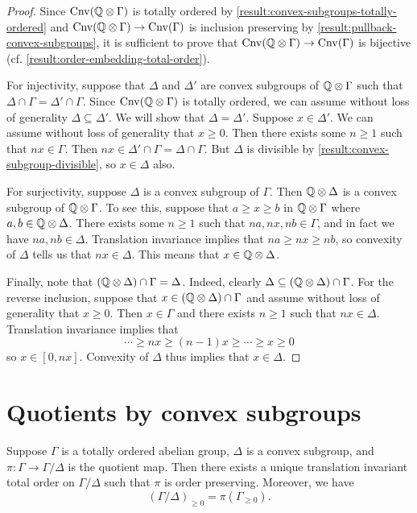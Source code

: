 \begin{proof}
Since $\operatorname{Cnv}(\mathbb{Q} \otimes \Gamma)$ is totally ordered by \cref{result:convex-subgroups-totally-ordered} and $\operatorname{Cnv}(\mathbb{Q} \otimes \Gamma) \to \operatorname{Cnv}(\Gamma)$ is inclusion preserving by \cref{result:pullback-convex-subgroups}, it is sufficient to prove that $\operatorname{Cnv}(\mathbb{Q} \otimes \Gamma) \to \operatorname{Cnv}(\Gamma)$ is bijective (cf. \cref{result:order-embedding-total-order}).  
	
For injectivity, suppose that $\Delta$ and $\Delta'$ are convex subgroups of $\mathbb{Q} \otimes \Gamma$ such that $\Delta \cap \Gamma = \Delta' \cap \Gamma$. Since $\operatorname{Cnv}(\mathbb{Q} \otimes \Gamma)$ is totally ordered, we can assume without loss of generality $\Delta \subseteq \Delta'$. We will show that $\Delta = \Delta'$. Suppose $x \in \Delta'$. We can assume without loss of generality that $x \geq 0$. Then there exists some $n \geq 1$ such that $nx \in \Gamma$. Then $nx \in \Delta' \cap \Gamma = \Delta \cap \Gamma$. But $\Delta$ is divisible by \cref{result:convex-subgroup-divisible}, so $x \in \Delta$ also. 

For surjectivity, suppose $\Delta$ is a convex subgroup of $\Gamma$. Then $\mathbb{Q} \otimes \Delta$ is a convex subgroup of $\mathbb{Q} \otimes \Gamma$. To see this, suppose that $a \geq x \geq b$ in $\mathbb{Q} \otimes \Gamma$ where $a, b \in \mathbb{Q} \otimes \Delta$. There exists some $n \geq 1$ such that $na, nx, nb \in \Gamma$, and in fact we have $na, nb \in \Delta$. Translation invariance implies that $na \geq nx \geq nb$, so convexity of $\Delta$ tells us that $nx \in \Delta$. This means that $x \in \mathbb{Q} \otimes \Delta$.

Finally, note that $(\mathbb{Q} \otimes \Delta) \cap \Gamma = \Delta$. Indeed, clearly $\Delta \subseteq (\mathbb{Q} \otimes \Delta) \cap \Gamma$. For the reverse inclusion, suppose that $x \in (\mathbb{Q} \otimes \Delta) \cap \Gamma$ and assume without loss of generality that $x \geq 0$. Then $x \in \Gamma$ and there exists $n \geq 1$ such that $nx \in \Delta$. Translation invariance implies that
\[ \dotsb \geq nx \geq (n-1)x \geq \dotsb \geq x \geq 0 \]
so $x \in [0, nx]$. Convexity of $\Delta$ thus implies that $x \in \Delta$. 
\end{proof}

\section{Quotients by convex subgroups}

\begin{lemma}
\label{result:quotient-order}
Suppose $\Gamma$ is a totally ordered abelian group, $\Delta$ is a convex subgroup, and $\pi : \Gamma \to \Gamma/\Delta$ is the quotient map. Then there exists a unique translation invariant total order on $\Gamma/\Delta$ such that $\pi$ is order preserving. Moreover, we have 
\[ (\Gamma/\Delta)_{\geq 0} = \pi(\Gamma_{\geq 0}). \]
\end{lemma}

